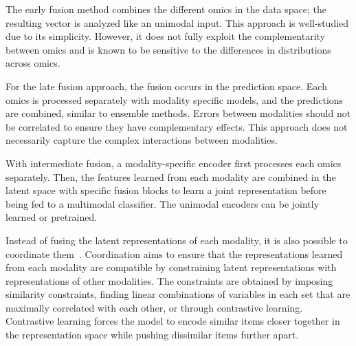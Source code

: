 \documentclass[../main.tex]{subfiles}
\begin{document}
	\begin{description}[%
			style=multiline,
			leftmargin=!,
			labelwidth=2.5cm,
		]
		\item[Early fusion]
			The early fusion method combines the different omics in the data space; the resulting vector is analyzed like an unimodal input.
			This approach is well-studied due to its simplicity.
			However, it does not fully exploit the complementarity between omics and is known to be sensitive to the differences in distributions across omics.
		\item[Late fusion]
			For the late fusion approach, the fusion occurs in the prediction space.
			Each omics is processed separately with modality specific models, and the predictions are combined, similar to ensemble methods.
			Errors between modalities should not be correlated to ensure they have complementary effects.
			This approach does not necessarily capture the complex interactions between modalities.
		\item[Intermediate fusion]
			With intermediate fusion, a modality-specific encoder first processes each omics separately.
			Then, the features learned from each modality are combined in the latent space with specific fusion blocks to learn a joint representation before being fed to a multimodal classifier.
			The unimodal encoders can be jointly learned or pretrained.
	\end{description}
	Instead of fusing the latent representations of each modality, it is also possible to coordinate them~\cite{MML_morency}.
	Coordination aims to ensure that the representations learned from each modality are compatible by constraining latent representations with representations of other modalities.
	The constraints are obtained by imposing similarity constraints, finding linear combinations of variables in each set that are maximally correlated with each other, or through contrastive learning.
	Contrastive learning forces the model to encode similar items closer together in the representation space while pushing dissimilar items further apart.
\end{document}
